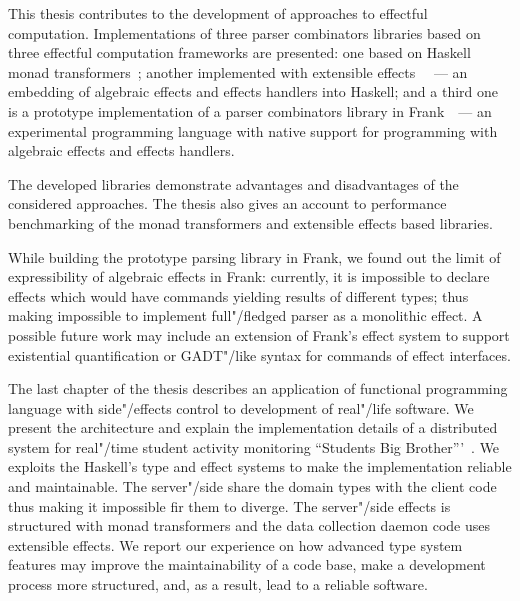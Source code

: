 \Conc

This thesis contributes to the development of approaches to effectful computation.
Implementations of three parser combinators libraries based on three
effectful computation frameworks are presented: one based on Haskell
monad transformers~\cite{mdParse};
another implemented with extensible effects~\cite{extEffParsers}~
--- an embedding of algebraic effects
and effects handlers into Haskell; and a third one is a prototype implementation
of a parser combinators library in Frank~\cite{frankoparsec}~---
an experimental programming language
with native support for programming with algebraic effects and effects handlers.

The developed libraries demonstrate advantages and disadvantages of the considered
approaches. The thesis also gives an account to performance benchmarking of the monad
transformers and extensible effects based libraries.

While building the prototype parsing library in Frank, we found out the limit of
expressibility of algebraic effects in Frank: currently, it is impossible to
declare effects which would have commands yielding results of different types;
thus making impossible to implement full"/fledged parser as a monolithic effect.
A possible future work may include an extension of Frank's effect system to support
existential quantification or GADT"/like syntax for commands of effect interfaces.

The last chapter of the thesis describes an application of functional programming
language with side"/effects control to development of real"/life software. We
present the architecture and explain the implementation details of a distributed
system for real"/time student activity monitoring
``Students Big Brother'''~\cite{sbbRepo}. We exploits the Haskell's type and effect
systems to make the implementation reliable and maintainable. The server"/side share
the domain types with the client code thus making it impossible fir them to diverge.
The server"/side effects is structured with monad transformers and the data collection
daemon code uses extensible effects. We report our experience on how advanced type system
features may improve the maintainability of a code base, make a development process
more structured, and, as a result, lead to a reliable software.

